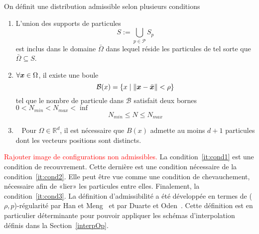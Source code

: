 \begin{definition}
    On définit une distribution admissible selon plusieurs conditions
    \begin{enumerate}
        \item L'union des supports de particules~\label{it:cond1}
              \begin{equation*}
                  S:= \bigcup_{p \in \mathcal P} S_p
              \end{equation*}
              est inclus dans le domaine $\bar \Omega$ dans lequel réside les particules de tel sorte que $\bar \Omega	\subseteq S$.
        \item $\forall \bm{x} \in \Omega$, il existe une boule~\label{it:cond2}
              \begin{equation*}
                  \mathcal B(x) = \{x \mid \|\bm{x} - \bar {\bm{x}}\| < \rho\}
              \end{equation*}tel que le nombre de particule dans $\mathcal B$ satisfait deux bornes $0 < N_{min} < N_{max} < \inf$
              \begin{equation*}
                  N_{min} \leq N \leq N_{max}
              \end{equation*}%
              \item~\label{it:cond3} Pour $\Omega \in \mathbb R^d$, il est nécessaire que $B(x)$ admette au moins $d+1$ particules dont les vecteurs positions sont distincts.%
    \end{enumerate}
\end{definition}

\textcolor{red}{Rajouter image de configurations non admissibles.}
La condition~\ref{it:cond1} est une condition de recouvrement. Cette dernière est une condition nécessaire de la condition~\ref{it:cond2}. Elle peut être vue comme une condition de chevauchement, nécessaire afin de «lier» les particules entre elles. Finalement, la condition~\ref{it:cond3}. La définition d'admissibilité a été développée en termes de ($\rho, p$)-régularité par Han et Meng~\cite{HAN20016157} et par Duarte et Oden~\cite{duarte1996hp}. Cette définition est en particulier déterminante pour pouvoir appliquer les schémas d'interpolation définis dans la Section~\ref{interpOp}.

